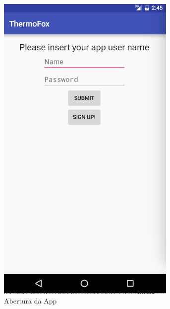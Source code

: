 \documentclass[a4paper]{article}
\begin{document}
\begin{figure}[H]
  \includegraphics[width=\linewidth]{welcomee.png}
  \caption{Abertura da App}\label{fig:welcome}
\endminipage\hfill
{}

\end{figure}
\end{document}
